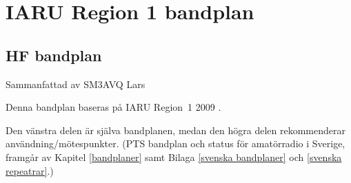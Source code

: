 \chapter{IARU Region 1 bandplan}
\label{IARU bandplan}

\section{HF bandplan}

Sammanfattad av SM3AVQ Lars

Denna bandplan baseras på IARU Region~1 2009 \cite{IARU1}.


Den vänstra delen är själva bandplanen, medan den högra delen rekommenderar användning/mötespunkter.
(PTS bandplan och status för amatörradio i Sverige, framgår av Kapitel \ref{bandplaner} samt Bilaga \ref{svenska bandplaner} och \ref{svenska repeatrar}.)

